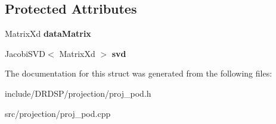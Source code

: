 \subsection*{Protected Attributes}
\begin{DoxyCompactItemize}
\item 
\hypertarget{struct_d_r_d_s_p_1_1_proj_p_o_d_a2abac29199ee32f41f33fa5bccba7a76}{Matrix\-Xd {\bfseries data\-Matrix}}\label{struct_d_r_d_s_p_1_1_proj_p_o_d_a2abac29199ee32f41f33fa5bccba7a76}

\item 
\hypertarget{struct_d_r_d_s_p_1_1_proj_p_o_d_aca1b8132b8de97c96f70c9a6613bbe17}{Jacobi\-S\-V\-D$<$ Matrix\-Xd $>$ {\bfseries svd}}\label{struct_d_r_d_s_p_1_1_proj_p_o_d_aca1b8132b8de97c96f70c9a6613bbe17}

\end{DoxyCompactItemize}


The documentation for this struct was generated from the following files\-:\begin{DoxyCompactItemize}
\item 
include/\-D\-R\-D\-S\-P/projection/proj\-\_\-pod.\-h\item 
src/projection/proj\-\_\-pod.\-cpp\end{DoxyCompactItemize}
